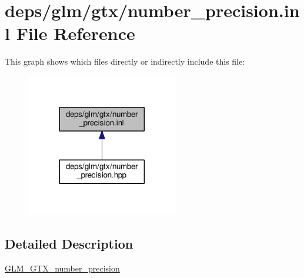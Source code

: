 \hypertarget{number__precision_8inl}{}\section{deps/glm/gtx/number\+\_\+precision.inl File Reference}
\label{number__precision_8inl}
This graph shows which files directly or indirectly include this file\+:
\nopagebreak
\begin{figure}[H]
\begin{center}
\leavevmode
\includegraphics[width=188pt]{d4/de0/number__precision_8inl__dep__incl}
\end{center}
\end{figure}


\subsection{Detailed Description}
\hyperlink{group__gtx__number__precision}{G\+L\+M\+\_\+\+G\+T\+X\+\_\+number\+\_\+precision} 